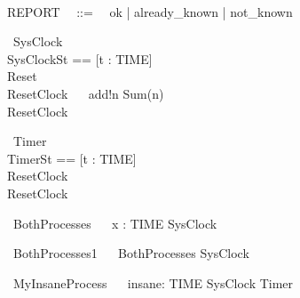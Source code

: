 \documentclass{llncs}
\begin{document}
\begin{zed}
\\
REPORT ~~::=~~ ok | already\_known | not\_known\\
\end{zed}
\begin{circus}
\circprocess ~SysClock ~\circdef~
\circbegin\\
  \circstate SysClockSt == [t : TIME]\\
  Reset ~\circdef~ \Skip\\
  ResetClock ~\circdef~ add!n \then Sum(n)\\
  \circspot ResetClock\\
  \circend
\end{circus}
\begin{circus}
\circprocess ~Timer ~\circdef~
\circbegin\\
  \circstate TimerSt == [t : TIME]\\
  ResetClock ~\circdef~\Skip\\
  \circspot ResetClock\\
  \circend
\end{circus}
\begin{circus}
\circprocess ~BothProcesses ~\circdef~ \Semi x : TIME \circspot SysClock\\
\end{circus}
\begin{circus}
\circprocess ~BothProcesses1 ~\circdef~ BothProcesses \circseq SysClock\\
\end{circus}
\begin{circus}
\circprocess ~MyInsaneProcess ~\circdef~ \Semi insane: TIME \circspot SysClock \circseq Timer\\
\end{circus}

\end{document}
